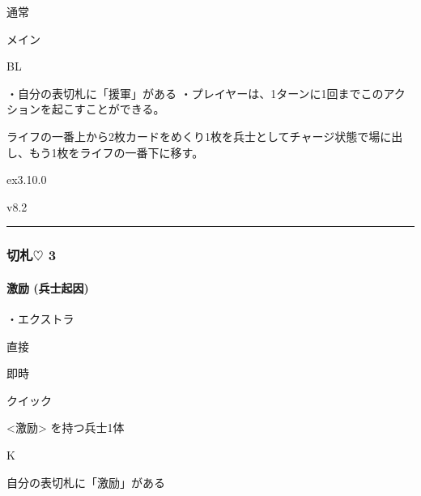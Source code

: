 \documentclass[letterpaper,10pt,dvipdfmx]{sphinxmanual}
\begin{document}
\sphinxAtStartPar
{} 通常

\sphinxAtStartPar
{} メイン

\sphinxAtStartPar
{} BL

\sphinxAtStartPar
{}

\sphinxAtStartPar
・自分の表切札に「援軍」がある
・プレイヤーは、1ターンに1回までこのアクションを起こすことができる。

\sphinxAtStartPar
{}

\sphinxAtStartPar
ライフの一番上から2枚カードをめくり1枚を兵士としてチャージ状態で場に出し、もう1枚をライフの一番下に移す。

\sphinxAtStartPar
{}  ex3.10.0

\sphinxAtStartPar
{}  v8.2


\bigskip\hrule\bigskip



\subsubsection{切札{\normalsize $\heartsuit$} 3}
\label{\detokenize{auto/frameActionlist:id33}}

\paragraph{激励 (兵士起因)}
\label{\detokenize{auto/frameActionlist:act-rally}}\label{\detokenize{auto/frameActionlist:id34}}
\sphinxAtStartPar
{}

\sphinxAtStartPar
・エクストラ

\sphinxAtStartPar
{} 直接

\sphinxAtStartPar
{} 即時

\sphinxAtStartPar
{} クイック

\sphinxAtStartPar
{} \textless{}激励\textgreater{} を持つ兵士1体

\sphinxAtStartPar
{} K

\sphinxAtStartPar
{}

\sphinxAtStartPar
自分の表切札に「激励」がある

\sphinxAtStartPar
{}
\end{document}
